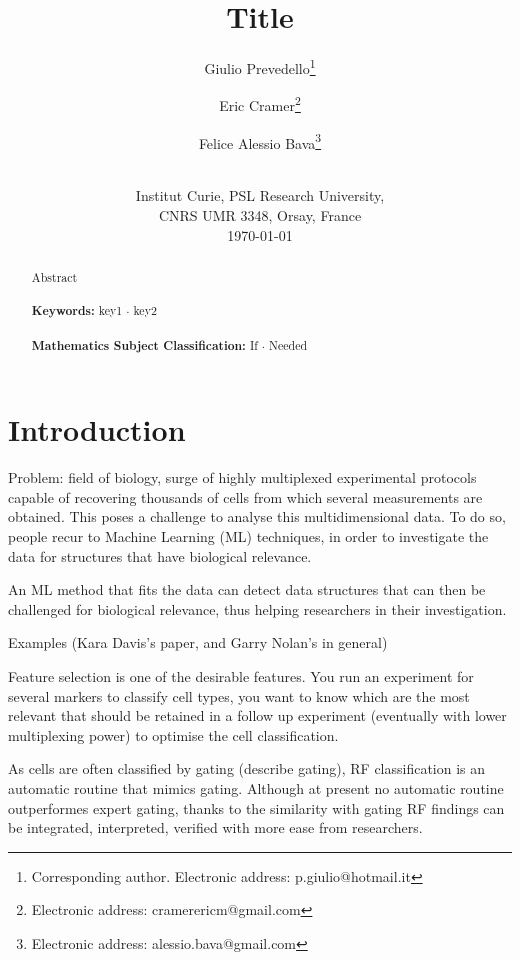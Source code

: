 \documentclass[12pt,a4paper]{article}
\theoremstyle{definition}
\theoremstyle{plain}
\theoremstyle{remark}
\begin{document}
\title{\textbf{Title}}

\author{Giulio Prevedello\footnote{
		Corresponding author. Electronic address: p.giulio@hotmail.it}
	\and
	Eric Cramer\footnote{
		Electronic address: cramerericm@gmail.com}
	\and
	Felice Alessio Bava\footnote{
		Electronic address: alessio.bava@gmail.com}\\ \\
}
\date{
	Institut Curie, PSL Research University,\\ CNRS UMR 3348, Orsay, France\\
	\medskip
	\today
}

\maketitle

\begin{abstract}
	Abstract\\
	\\
	\textbf{Keywords:} key1 $\cdot$ key2 \\
	\\
	\textbf{Mathematics Subject Classification:} If $\cdot$ Needed
	\end{abstract}

\section{Introduction}
\label{sec:intro}
Problem: field of biology, surge of highly multiplexed experimental protocols capable of recovering thousands of cells from which several measurements are obtained. This poses a challenge to analyse this multidimensional data. To do so, people recur to Machine Learning (ML) techniques, in order to investigate the data for structures that have biological relevance.

An ML method that fits the data can detect data structures that can then be challenged for biological relevance, thus helping researchers in their investigation.

Examples (Kara Davis's paper, and Garry Nolan's in general)

Feature selection is one of the desirable features. You run an experiment for several markers to classify cell types, you want to know which are the most relevant that should be retained in a follow up experiment (eventually with lower multiplexing power) to optimise the cell classification.

As cells are often classified by gating (describe gating), RF classification is an automatic routine that mimics gating. Although at present no automatic routine outperformes expert gating, thanks to the similarity with gating RF findings can be integrated, interpreted, verified with more ease from researchers.
\end{document}
